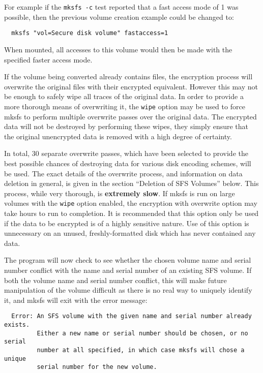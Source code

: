 For example if the {\tt mksfs -c} test reported that a fast access mode of 1 was
possible, then the previous volume creation example could be changed to:

\begin{verbatim}
  mksfs "vol=Secure disk volume" fastaccess=1
\end{verbatim}

When mounted, all accesses to this volume would then be made with the specified
faster access mode.

If the volume being converted already contains files, the encryption process
will overwrite the original files with their encrypted equivalent.  However
this may not be enough to safely wipe all traces of the original data.  In
order to provide a more thorough means of overwriting it, the {\tt wipe} option may
be used to force mksfs to perform multiple overwrite passes over the original
data.  The encrypted data will not be destroyed by performing these wipes, they
simply ensure that the original unencrypted data is removed with a high degree
of certainty.

In total, 30 separate overwrite passes, which have been selected to provide the
best possible chances of destroying data for various disk encoding schemes,
will be used.  The exact details of the overwrite process, and information on
data deletion in general, is given in the section ``Deletion of SFS Volumes''
below.  This process, while very thorough, is {\bf extremely slow}.  If mksfs is 
run on large volumes with the {\tt wipe} option enabled, the encryption with 
overwrite option may take hours to run to completion.  It is recommended that 
this option only be used if the data to be encrypted is of a highly sensitive 
nature.  Use of this option is unnecessary on an unused, freshly-formatted disk 
which has never contained any data.

The program will now check to see whether the chosen volume name and serial
number conflict with the name and serial number of an existing SFS volume.  If 
both the volume name and serial number conflict, this will make future 
manipulation of the volume difficult as there is no real way to uniquely identify 
it, and mksfs will exit with the error message:

{\small
\begin{verbatim}
  Error: An SFS volume with the given name and serial number already exists.
         Either a new name or serial number should be chosen, or no serial
         number at all specified, in which case mksfs will chose a unique
         serial number for the new volume.
\end{verbatim}}

